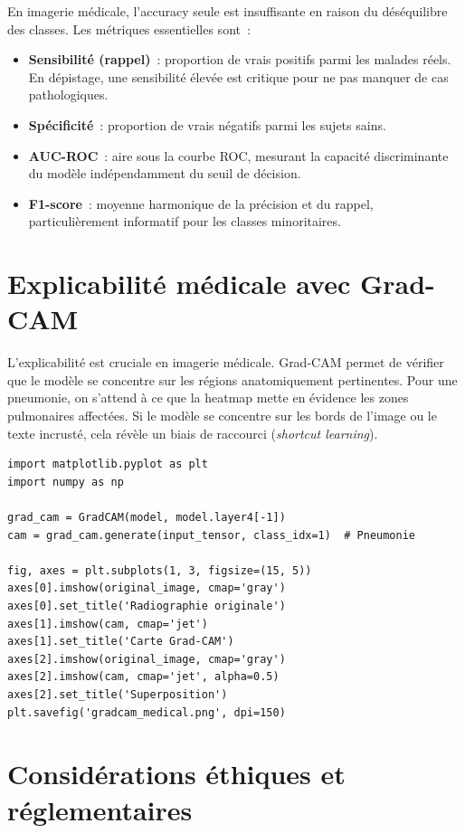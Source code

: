 \documentclass[a4paper,11pt,twoside]{book}
\begin{document}
En imagerie médicale, l'accuracy seule est insuffisante en raison du déséquilibre des classes. Les métriques essentielles sont~:

\begin{itemize}[leftmargin=2em]
  \item \textbf{Sensibilité (rappel)}~: proportion de vrais positifs parmi les malades réels. En dépistage, une sensibilité élevée est critique pour ne pas manquer de cas pathologiques.
  \item \textbf{Spécificité}~: proportion de vrais négatifs parmi les sujets sains.
  \item \textbf{AUC-ROC}~: aire sous la courbe ROC, mesurant la capacité discriminante du modèle indépendamment du seuil de décision.
  \item \textbf{F1-score}~: moyenne harmonique de la précision et du rappel, particulièrement informatif pour les classes minoritaires.
\end{itemize}

\section{Explicabilité médicale avec Grad-CAM}

L'explicabilité est cruciale en imagerie médicale. Grad-CAM permet de vérifier que le modèle se concentre sur les régions anatomiquement pertinentes. Pour une pneumonie, on s'attend à ce que la heatmap mette en évidence les zones pulmonaires affectées. Si le modèle se concentre sur les bords de l'image ou le texte incrusté, cela révèle un biais de raccourci (\textit{shortcut learning}).

\begin{lstlisting}[caption={Visualisation Grad-CAM pour une radiographie}]
import matplotlib.pyplot as plt
import numpy as np

grad_cam = GradCAM(model, model.layer4[-1])
cam = grad_cam.generate(input_tensor, class_idx=1)  # Pneumonie

fig, axes = plt.subplots(1, 3, figsize=(15, 5))
axes[0].imshow(original_image, cmap='gray')
axes[0].set_title('Radiographie originale')
axes[1].imshow(cam, cmap='jet')
axes[1].set_title('Carte Grad-CAM')
axes[2].imshow(original_image, cmap='gray')
axes[2].imshow(cam, cmap='jet', alpha=0.5)
axes[2].set_title('Superposition')
plt.savefig('gradcam_medical.png', dpi=150)
\end{lstlisting}

\section{Considérations éthiques et réglementaires}
\end{document}
